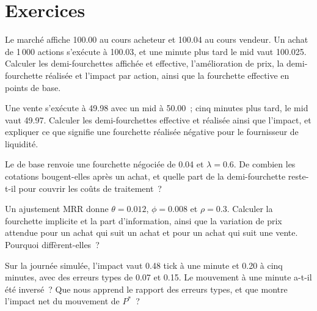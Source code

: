 \section{Exercices}

\begin{exercise}[$\star$]\label{exo:mx:decomposing-the-spread:1}
Le marché affiche 100.00 au cours acheteur et 100.04 au cours vendeur. Un achat de 1\,000 actions s'exécute à 100.03, et une minute plus tard le mid vaut 100.025. Calculer les demi-fourchettes affichée et effective,
l'amélioration de prix, la demi-fourchette réalisée et l'impact par action, ainsi que la fourchette effective en points de base.
\end{exercise}

\begin{exercise}[$\star$]\label{exo:mx:decomposing-the-spread:2}
Une vente s'exécute à 49.98 avec un mid à 50.00~; cinq minutes plus tard, le mid vaut 49.97. Calculer les demi-fourchettes effective et réalisée ainsi que l'impact, et expliquer
ce que signifie une fourchette réalisée négative pour le fournisseur de liquidité.
\end{exercise}

\begin{exercise}[$\star$]\label{exo:mx:decomposing-the-spread:3}
Le  de base renvoie une fourchette négociée de 0.04 et $\lambda=0.6$. De combien les cotations bougent-elles après un achat, et quelle part de la demi-fourchette
reste-t-il pour couvrir les coûts de traitement~?
\end{exercise}

\begin{exercise}[$\star\star$]\label{exo:mx:decomposing-the-spread:4}
Un ajustement MRR donne $\theta=0.012$, $\phi=0.008$ et $\rho=0.3$. Calculer la fourchette implicite et la part d'information, ainsi que la variation de prix attendue pour un achat qui
suit un achat et pour un achat qui suit une vente. Pourquoi diffèrent-elles~?
\end{exercise}

\begin{exercise}[$\star\star$]\label{exo:mx:decomposing-the-spread:5}
Sur la journée simulée, l'impact vaut 0.48 tick à une minute et 0.20 à cinq minutes, avec des erreurs types de 0.07 et 0.15. Le mouvement à une minute a-t-il été inversé~? Que nous apprend
le rapport des erreurs types, et que montre l'impact net du mouvement de $P^\ast$~?
\end{exercise}

